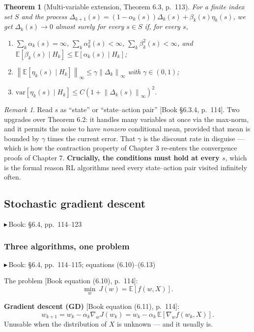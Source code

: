 \documentclass[11pt, letterpaper]{article}
\theoremstyle{runin}
\theoremstyle{runinplain}
\newtheorem{theorem}{Theorem}[section]
\theoremstyle{remark}
\newtheorem*{remark}{Remark}
\newcommand{\E}{\mathbb{E}}
\newcommand{\Var}{\mathrm{var}}
\newcommand{\norm}[1]{\left\lVert #1 \right\rVert}
\newcommand{\bk}[1]{{\color{bookblue}\small$\blacktriangleright$\,\textsf{Book: #1}}}
\newcommand{\bkin}[1]{{\color{bookblue}\small[\textsf{Book #1}]}}
\begin{document}
\begin{theorem}[Multi-variable extension, Theorem 6.3, p.~113]
For a finite index set $S$ and the process
$\Delta_{k+1}(s)=(1-\alpha_k(s))\Delta_k(s)+\beta_k(s)\eta_k(s)$, we get
$\Delta_k(s)\to0$ almost surely for every $s\in S$ if, for every $s$,
\begin{enumerate}
  \item[(a)] $\sum_k\alpha_k(s)=\infty$, $\sum_k\alpha_k^2(s)<\infty$,
             $\sum_k\beta_k^2(s)<\infty$, and
             $\E[\beta_k(s)\mid H_k]\le\E[\alpha_k(s)\mid H_k]$;
  \item[(b)] $\norm{\E[\eta_k(s)\mid H_k]}_\infty\le\gamma\norm{\Delta_k}_\infty$
             with $\gamma\in(0,1)$;
  \item[(c)] $\Var[\eta_k(s)\mid H_k]\le C(1+\norm{\Delta_k(s)}_\infty)^2$.
\end{enumerate}
\end{theorem}

\begin{remark}
Read $s$ as ``state'' or ``state--action pair'' \bkin{\S6.3.4, p.~114}. Two upgrades
over Theorem 6.2: it handles many variables at once via the max-norm, and it
permits the noise to have \emph{nonzero} conditional mean, provided that mean is
bounded by $\gamma$ times the current error. That $\gamma$ is the discount rate in
disguise --- which is how the contraction property of Chapter 3 re-enters the
convergence proofs of Chapter 7. \textbf{Crucially, the conditions must hold at
every $s$}, which is the formal reason RL algorithms need every state--action pair
visited infinitely often.
\end{remark}

\subsection{Stochastic gradient descent}

\bk{\S6.4, pp.~114--123}

\subsubsection{Three algorithms, one problem}

\bk{\S6.4, pp.~114--115; equations (6.10)--(6.13)}

The problem \bkin{equation (6.10), p.~114}:
\[
  \min_w\ J(w)=\E[f(w,X)].
\]

\textbf{Gradient descent (GD)} \bkin{equation (6.11), p.~114}:
\[
  w_{k+1}=w_k-\alpha_k\nabla_wJ(w_k)=w_k-\alpha_k\,\E[\nabla_wf(w_k,X)].
\]
Unusable when the distribution of $X$ is unknown --- and it usually is.
\end{document}
